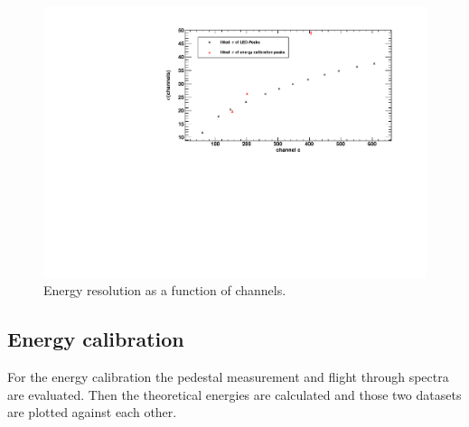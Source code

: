 \begin{figure}[H]
\begin{center}
  \includegraphics[width=\textwidth]{../img/energieaufloesung_channels+ecal.pdf}
  \caption{Energy resolution as a function of channels.}
  \label{img:eres:channels}
\end{center}
\end{figure}

\subsection{Energy calibration}
For the energy calibration the pedestal measurement and flight through spectra are evaluated. Then the theoretical energies are calculated 
and those two datasets are plotted against each other.
